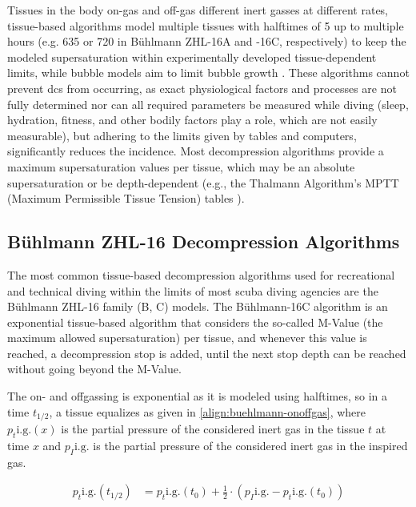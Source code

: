 Tissues in the body on-gas and off-gas different inert gasses at different rates, tissue-based algorithms model multiple tissues with halftimes of \SI{5}{\min} up to multiple hours (e.g. \SI{635}{\min} or \SI{720}{\min} in Bühlmann ZHL-16A and -16C, respectively) to keep the modeled supersaturation within experimentally developed tissue-dependent limits, while bubble models aim to limit bubble growth \cite{overview-dci-2024}. 
These algorithms cannot prevent \gls{dcs} from occurring, as exact physiological factors and processes are not fully determined nor can all required parameters be measured while diving (sleep, hydration, fitness, and other bodily factors play a role, which are not easily measurable), but adhering to the limits given by tables and computers, significantly reduces the incidence.
Most decompression algorithms provide a maximum supersaturation values per tissue, which may be an absolute supersaturation or be depth-dependent (e.g., the Thalmann Algorithm's MPTT (Maximum Permissible Tissue Tension) tables \cite{thalmann-parameters-1.3-2020}\cite{thalmann-tables-software-2010}).

\subsection{Bühlmann ZHL-16 Decompression Algorithms}\label{subsection:buehlmann-decompression-algorithm}
The most common tissue-based decompression algorithms used for recreational and technical diving within the limits of most \gls{scuba} diving agencies are the Bühlmann ZHL-16 family (B, C) models.
The Bühlmann-16C algorithm is an exponential tissue-based algorithm that considers the so-called M-Value (the maximum allowed supersaturation) per tissue, and whenever this value is reached, a decompression stop is added, until the next stop depth can be reached without going beyond the M-Value.

The on- and offgassing is exponential as it is modeled using halftimes, so in a time $t_{1/2}$, a tissue equalizes as given in \ref{align:buehlmann-onoffgas}, where $p_t\mathrm{i.g.} (x)$ is the partial pressure of the considered inert gas in the tissue $t$ at time $x$ and $p_I\mathrm{i.g.}$ is the partial pressure of the considered inert gas in the inspired gas.

\begin{align}
    p_t\mathrm{i.g.}(t_{1/2}) &= p_t\mathrm{i.g.}(t_0) + \frac{1}{2}\cdot \left(p_I\mathrm{i.g.} - p_t\mathrm{i.g.}(t_0)\right) \label{align:buehlmann-onoffgas}
\end{align}

